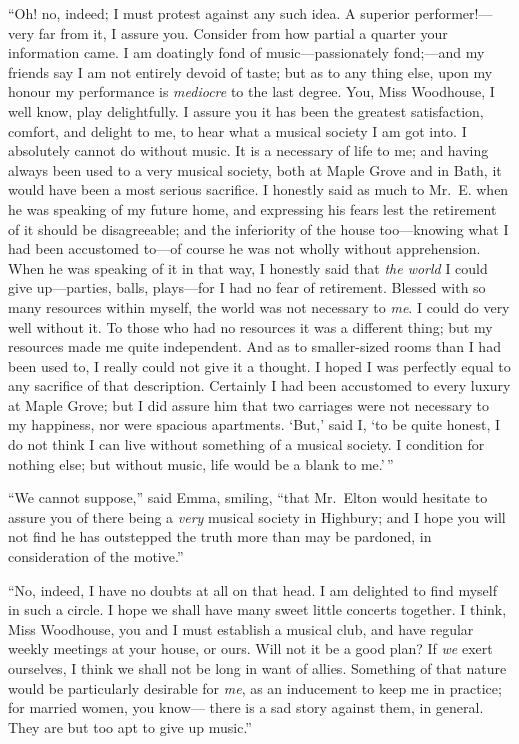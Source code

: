 ``Oh! no, indeed; I must protest against any such idea.
A superior performer!---very far from it, I assure you.
Consider from how partial a quarter your information came.
I am doatingly fond of music---passionately fond;---and my friends
say I am not entirely devoid of taste; but as to any thing else,
upon my honour my performance is \emph{mediocre} to the last degree.
You, Miss Woodhouse, I well know, play delightfully.  I assure you
it has been the greatest satisfaction, comfort, and delight to me,
to hear what a musical society I am got into.  I absolutely cannot
do without music.  It is a necessary of life to me; and having always
been used to a very musical society, both at Maple Grove and in Bath,
it would have been a most serious sacrifice.  I honestly said as much
to Mr.\ E. when he was speaking of my future home, and expressing
his fears lest the retirement of it should be disagreeable;
and the inferiority of the house too---knowing what I had been
accustomed to---of course he was not wholly without apprehension.
When he was speaking of it in that way, I honestly said that \emph{the
world} I could give up---parties, balls, plays---for I had no fear
of retirement.  Blessed with so many resources within myself,
the world was not necessary to \emph{me}.  I could do very well without it.
To those who had no resources it was a different thing; but my
resources made me quite independent.  And as to smaller-sized rooms
than I had been used to, I really could not give it a thought.
I hoped I was perfectly equal to any sacrifice of that description.
Certainly I had been accustomed to every luxury at Maple Grove; but I
did assure him that two carriages were not necessary to my happiness,
nor were spacious apartments.  `But,' said I, `to be quite honest,
I do not think I can live without something of a musical society.
I condition for nothing else; but without music, life would be a blank
to me.'\,''

``We cannot suppose,'' said Emma, smiling, ``that Mr.\ Elton would hesitate
to assure you of there being a \emph{very} musical society in Highbury;
and I hope you will not find he has outstepped the truth more than
may be pardoned, in consideration of the motive.''

``No, indeed, I have no doubts at all on that head.  I am delighted
to find myself in such a circle.  I hope we shall have many sweet
little concerts together.  I think, Miss Woodhouse, you and I
must establish a musical club, and have regular weekly meetings
at your house, or ours.  Will not it be a good plan?  If \emph{we}
exert ourselves, I think we shall not be long in want of allies.
Something of that nature would be particularly desirable for \emph{me},
as an inducement to keep me in practice; for married women, you know---%
there is a sad story against them, in general.  They are but too apt
to give up music.''

